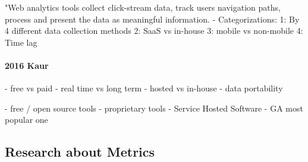 "Web analytics tools collect click-stream data, track users navigation paths, process and present the data as meaningful information.
- Categorizations:
1: By 4 different data collection methods
2: SaaS vs in-house
3: mobile vs non-mobile
4: Time lag












\paragraph{2016 Kaur}







- free vs paid
- real time vs long term
- hosted vs in-house
- data portability









- free / open source tools
- proprietary tools
- Service Hosted Software
- GA most popular one













\subsection{Research about Metrics}







